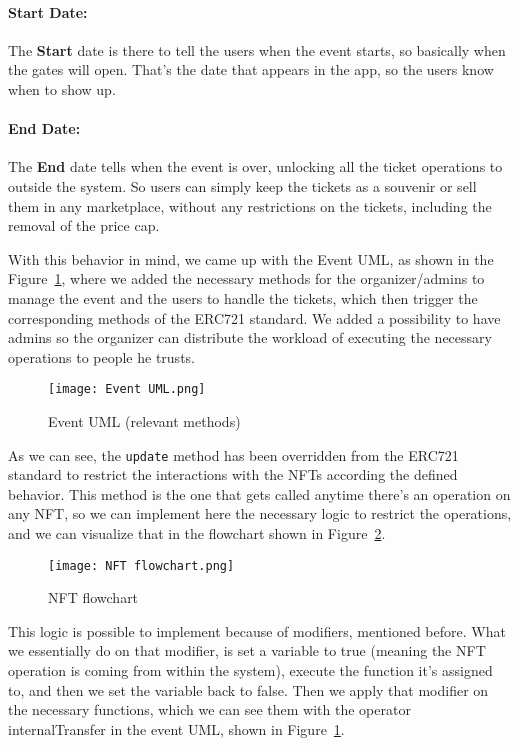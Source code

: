 \paragraph{Start Date:} The \textbf{Start} date is there to tell the users when the event starts, so
basically when the gates will open. That's the date that appears in the app, so
the users know when to show up.

\paragraph{End Date:} The \textbf{End} date tells when the event is over, unlocking all the ticket
operations to outside the system. So users can simply keep the tickets as a
souvenir or sell them in any marketplace, without any restrictions on the
tickets, including the removal of the price cap.

With this behavior in mind, we came up with the Event UML, as shown in the
Figure~\ref{fig:event_uml}, where we added the necessary methods for the
organizer/admins to manage the event and the users to handle the tickets, which
then trigger the corresponding methods of the ERC721 standard. We added a
possibility to have admins so the organizer can distribute the workload of
executing the necessary operations to people he trusts.

\begin{figure}[H]
	\texttt{[image: Event UML.png]}
	\centering
	\caption{Event UML (relevant methods)}\label{fig:event_uml}
\end{figure}

As we can see, the \texttt{update} method has been overridden from the ERC721
standard to restrict the interactions with the NFTs according the defined
behavior. This method is the one that gets called anytime there's an operation
on any NFT, so we can implement here the necessary logic to restrict the
operations, and we can visualize that in the flowchart shown in
Figure~\ref{fig:nft_flowchart}.

\begin{figure}[H]
	\texttt{[image: NFT flowchart.png]}
	\centering
	\caption{NFT flowchart}\label{fig:nft_flowchart}
\end{figure}

This logic is possible to implement because of modifiers, mentioned before.
What we essentially do on that modifier, is set a variable to true (meaning the
NFT operation is coming from within the system), execute the function it's
assigned to, and then we set the variable back to false. Then we apply that
modifier on the necessary functions, which we can see them with the operator
	{internalTransfer} in the event UML, shown in Figure~\ref{fig:event_uml}.

